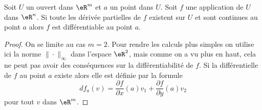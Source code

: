 \begin{proposition}		\label{Diff_totale}
 Soit $U$ un ouvert dans $\eR^m$ et $a$ un point dans $U$. Soit $f$ une application de $U$ dans $\eR^n$. Si toute les dérivée partielles de $f$ existent sur \( U\) et sont continues au point $a$ alors $f$ est différentiable au point $a$.
\end{proposition}
\begin{proof} 
 On se limite au cas $m=2$.  Pour rendre les calculs plus simples on utilise ici la norme $\|\cdot\|_\infty$ dans l'espace $\eR^2$, mais comme on a vu plus en haut, cela ne peut pas avoir des conséquences sur la différentiabilité de $f$. Si la différentielle de $f$ au point $a$ existe alors elle est définie par la formule
\[
    df_a(v)=\frac{ \partial f }{ \partial x }(a)v_1+\frac{ \partial f }{ \partial y }(a)v_2
\] 
pour tout $v$ dans $\eR^m$. 


\end{proof}
